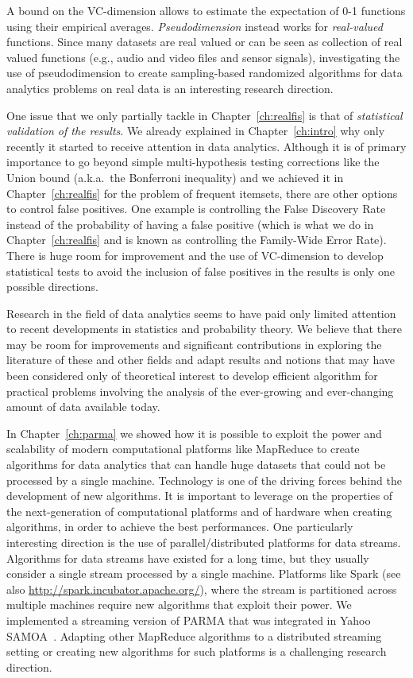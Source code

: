 A bound on the VC-dimension allows to estimate the expectation of 0-1 functions
using their empirical averages. \emph{Pseudodimension} instead works for
\emph{real-valued} functions. Since many datasets are real valued or can be seen
as collection of real valued functions (e.g., audio and video files and sensor
signals), investigating the use of pseudodimension to create sampling-based
randomized algorithms for data analytics problems on real data is an interesting
research direction.

One issue that we only partially tackle in Chapter~\ref{ch:realfis} is that of
\emph{statistical validation of the results}. We already explained in
Chapter~\ref{ch:intro} why only recently it started to receive attention in data
analytics. Although it is of primary importance to go beyond
simple multi-hypothesis testing corrections like the Union bound (a.k.a.~the
Bonferroni inequality) and we achieved it in Chapter~\ref{ch:realfis} for the
problem of frequent itemsets, there are other options to control false
positives. One example is controlling the False Discovery
Rate~\citep{BenjaminiH95} instead of the probability of having a false positive
(which is what we do in Chapter~\ref{ch:realfis} and is known as controlling the
Family-Wide Error Rate). There is huge room for improvement and the use of
VC-dimension to develop statistical tests to avoid the inclusion of false
positives in the results is only one possible directions. 

Research in the field of data analytics seems to have paid only limited
attention to recent developments in statistics and probability theory. We
believe that there may be room for improvements and significant contributions in
exploring the literature of these and other fields and adapt results and notions
that may have been considered only of theoretical interest to develop efficient
algorithm for practical problems involving the analysis of the ever-growing and
ever-changing amount of data available today.

In Chapter~\ref{ch:parma} we showed how it is possible to exploit the
power and scalability of modern computational platforms like MapReduce to create
algorithms for data analytics that can handle huge datasets that could not be
processed by a single machine. Technology is one of the driving forces behind
the development of new algorithms. It is important to leverage on the properties
of the next-generation of computational platforms and of hardware when
creating algorithms, in order to achieve the best performances. One particularly
interesting direction is the use of parallel/distributed platforms for data
streams. Algorithms for data streams have existed for a long time, but they
usually consider a single stream processed by a single machine. Platforms like
Spark\citep{ZahariaCFSS13} (see also \url{http://spark.incubator.apache.org/}),
where the stream is partitioned across multiple machines require new algorithms
that exploit their power. We implemented a streaming version of PARMA that was
integrated in Yahoo SAMOA~\citep{DFMorales13}. Adapting other MapReduce
algorithms to a distributed streaming setting or creating new algorithms for
such platforms is a challenging research direction.

